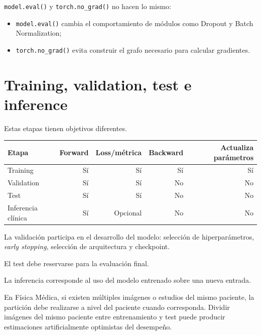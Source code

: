 \documentclass[
  letterpaper,
  DIV=11,
  numbers=noendperiod]{scrartcl}
\newcounter{none} %
\providecommand{\tightlist}{%
  \setlength{\itemsep}{0pt}\setlength{\parskip}{0pt}}
\begin{document}
\texttt{model.eval()} y \texttt{torch.no\_grad()} no hacen lo mismo:

\begin{itemize}
\tightlist
\item
  \texttt{model.eval()} cambia el comportamiento de módulos como Dropout
  y Batch Normalization;
\item
  \texttt{torch.no\_grad()} evita construir el grafo necesario para
  calcular gradientes.
\end{itemize}

\section{Training, validation, test e
inference}\label{training-validation-test-e-inference}

Estas etapas tienen objetivos diferentes.

{\def\LTcaptype{none} %
\begin{longtable}[]{@{}lrrrr@{}}
\toprule\noalign{}
Etapa & Forward & Loss/métrica & Backward & Actualiza parámetros \\
\midrule\noalign{}
\endhead
\bottomrule\noalign{}
\endlastfoot
Training & Sí & Sí & Sí & Sí \\
Validation & Sí & Sí & No & No \\
Test & Sí & Sí & No & No \\
Inferencia clínica & Sí & Opcional & No & No \\
\end{longtable}
}

La validación participa en el desarrollo del modelo: selección de
hiperparámetros, \emph{early stopping}, selección de arquitectura y
checkpoint.

El test debe reservarse para la evaluación final.

La inferencia corresponde al uso del modelo entrenado sobre una nueva
entrada.

\begin{tcolorbox}[enhanced jigsaw, arc=.35mm, bottomrule=.15mm, bottomtitle=1mm, breakable, colback=white, colbacktitle=quarto-callout-warning-color!10!white, colframe=quarto-callout-warning-color-frame, coltitle=black, left=2mm, leftrule=.75mm, opacityback=0, opacitybacktitle=0.6, rightrule=.15mm, title=\textcolor{quarto-callout-warning-color}{\faExclamationTriangle}\hspace{0.5em}{Data leakage}, titlerule=0mm, toprule=.15mm, toptitle=1mm]

En Física Médica, si existen múltiples imágenes o estudios del mismo
paciente, la partición debe realizarse a nivel del paciente cuando
corresponda. Dividir imágenes del mismo paciente entre entrenamiento y
test puede producir estimaciones artificialmente optimistas del
desempeño.

\end{tcolorbox}
\end{document}
